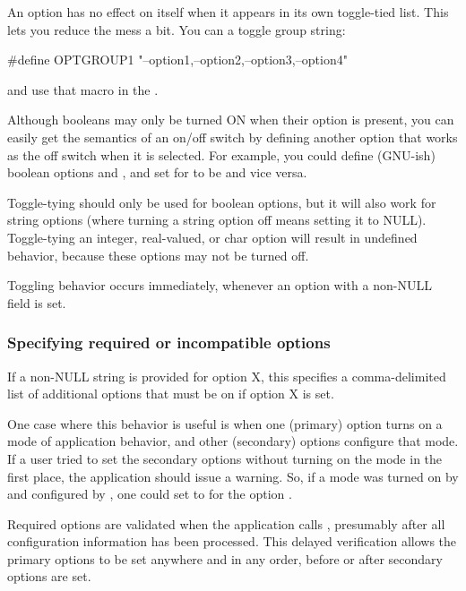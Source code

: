 An option has no effect on itself when it appears in its own
toggle-tied list. This lets you reduce the mess a bit. You can
 a toggle group string: 

\begin{cchunk}
  #define OPTGROUP1 "--option1,--option2,--option3,--option4"
\end{cchunk}

and use that  macro in the .

Although booleans may only be turned ON when their option is present,
you can easily get the semantics of an on/off switch by defining
another option that works as the off switch when it is selected. For
example, you could define (GNU-ish) boolean options  and
, and set  for  to be
 and vice versa.  

Toggle-tying should only be used for boolean options, but it will also
work for string options (where turning a string option off means
setting it to NULL). Toggle-tying an integer, real-valued, or char
option will result in undefined behavior, because these options may
not be turned off.

Toggling behavior occurs immediately, whenever an option with a
non-NULL  field is set.



   \subsubsection{Specifying required or incompatible options}

If a non-NULL string  is provided for option X,
this specifies a comma-delimited list of additional options that must
be on if option X is set. 

One case where this behavior is useful is when one (primary) option
turns on a mode of application behavior, and other (secondary) options
configure that mode. If a user tried to set the secondary options
without turning on the mode in the first place, the application should
issue a warning. So, if a mode was turned on by  and
configured by , one could set
 to  for the option
.

Required options are validated when the application calls
, presumably after all configuration
information has been processed. This delayed verification allows the
primary options to be set anywhere and in any order, before or after
secondary options are set.

